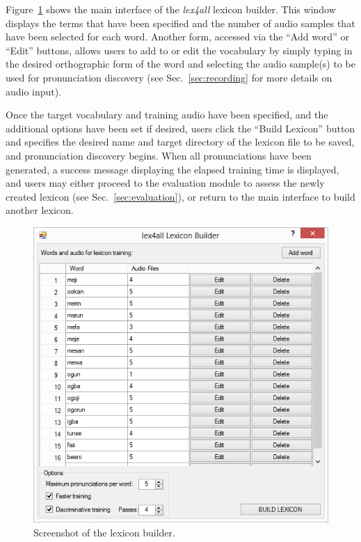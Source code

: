 \documentclass[11pt]{article}
\begin{document}
Figure~\ref{fig:mainform} shows the main interface of the \textit{lex4all} lexicon builder. This window displays the terms that have been specified and the number of audio samples that have been selected for each word. Another form, accessed via the ``Add word'' or ``Edit'' buttons, allows users to add to or edit the vocabulary by simply typing in the desired orthographic form of the word and selecting the audio sample(s) to be used for pronunciation discovery 
(see Sec.~\ref{sec:recording} for more details on audio input).


Once the target vocabulary and training audio have been specified, and the additional options have been set if desired, users click the ``Build Lexicon'' button and specifies the desired name and target directory of the lexicon file to be saved, 
and pronunciation discovery begins. 
When all pronunciations have been generated, a success message displaying the elapsed training time is displayed, and users may either proceed to the evaluation module to assess the newly created lexicon (see Sec.~\ref{sec:evaluation}), or  return to the main interface to build another lexicon. 

\begin{figure}[tb]
\begin{center}
\includegraphics[width=\columnwidth]{../screenshots/LexiconBuilder-Main-Filled-scrolling.PNG}
\caption{Screenshot of the lexicon builder.\label{fig:mainform}}
\end{center}
\end{figure}
\end{document}
